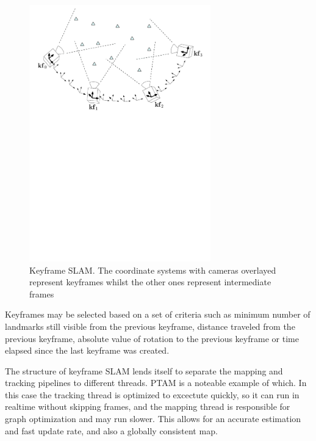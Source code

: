 \begin{figure}[h]
  \centering
    \includegraphics[width=0.7\textwidth]{chapters/images/keyframes}
  \caption{Keyframe SLAM.  The coordinate systems with cameras overlayed represent keyframes whilst the other ones represent intermediate frames}
  \label{fig:keyframe_slam}
\end{figure}

Keyframes may be selected based on a set of criteria such as minimum number of landmarks still visible from the previous keyframe, distance traveled from the previous keyframe, absolute value of rotation to the previous keyframe or time elapsed since the last keyframe was created. 

The structure of keyframe SLAM lends itself to separate the mapping and tracking pipelines to different threads.  PTAM\cite{ptam} is a noteable example of which.  In this case the tracking thread is optimized to excectute quickly, so it can run in realtime without skipping frames, and the mapping thread is responsible for graph optimization and may run slower.  This allows for an accurate estimation and fast update rate, and also a globally consistent map.


